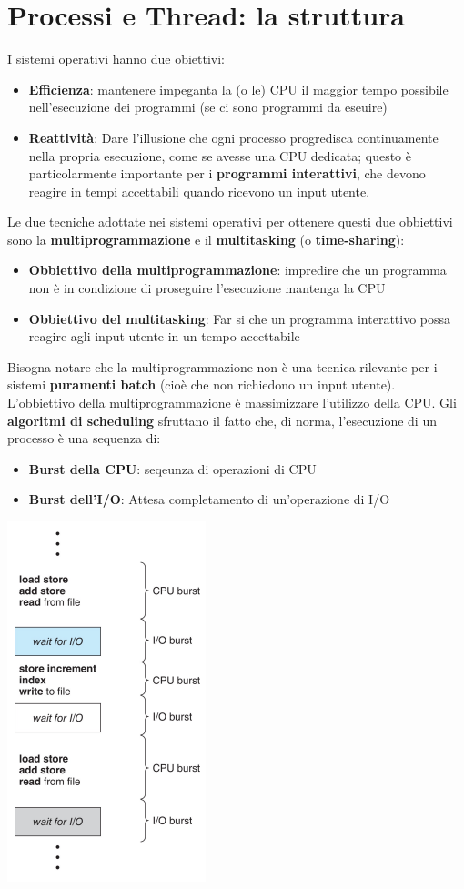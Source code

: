 \documentclass[12pt]{article}
\begin{document}
\section{Processi e Thread: la struttura}
I sistemi operativi hanno due obiettivi:
\begin{itemize}
    \item \textbf{Efficienza}: mantenere impeganta la (o le) CPU il maggior tempo possibile nell'esecuzione dei programmi (se ci sono programmi da eseuire)
    \item \textbf{Reattività}: Dare l'illusione che ogni processo progredisca continuamente nella propria esecuzione, come se avesse una CPU dedicata; questo è particolarmente importante per i \textbf{programmi interattivi}, che devono reagire in tempi accettabili quando ricevono un input utente.
\end{itemize}
Le due tecniche adottate nei sistemi operativi per ottenere questi due obbiettivi sono la \textbf{multiprogrammazione} e il \textbf{multitasking} (o \textbf{time-sharing}):
\begin{itemize}
    \item \textbf{Obbiettivo della multiprogrammazione}: impredire che un programma non è in condizione di proseguire l'esecuzione mantenga la CPU
    \item \textbf{Obbiettivo del multitasking}: Far si che un programma interattivo possa reagire agli input utente in un tempo accettabile
\end{itemize}
Bisogna notare che la multiprogrammazione non è una tecnica rilevante per i sistemi \textbf{puramenti batch} (cioè che non richiedono un input utente).
L'obbiettivo della multiprogrammazione è massimizzare l'utilizzo della CPU. Gli \textbf{algoritmi di scheduling} sfruttano il fatto che, di norma, l'esecuzione di un processo è una sequenza di:
\begin{itemize}
    \item \textbf{Burst della CPU}: seqeunza di operazioni di CPU
    \item \textbf{Burst dell'I/O}: Attesa completamento di un'operazione di I/O
\end{itemize}
\begin{center}
    \includegraphics[width = 0.28\linewidth]{Images/36.png}
\end{center}
\end{document}
